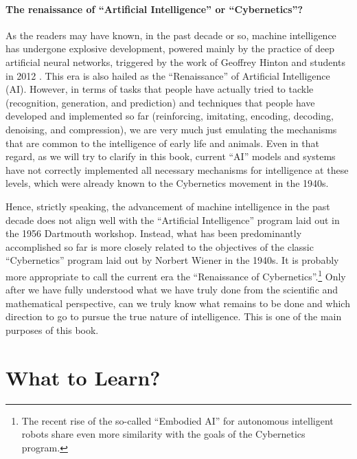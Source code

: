 \documentclass[../../book-main.tex]{subfiles}
\begin{document}
\paragraph{The renaissance of ``Artificial Intelligence'' or ``Cybernetics''?}
As the readers may have known, in the past decade or so, machine intelligence has undergone explosive development, powered mainly by the practice of deep artificial neural networks, triggered by the work of Geoffrey Hinton and students in 2012 \cite{krizhevsky2012imagenet}. This era is also hailed as the ``Renaissance'' of Artificial Intelligence (AI). However, in terms of tasks that people have actually tried to tackle (recognition, generation, and prediction) and techniques that people have developed and implemented so far (reinforcing, imitating, encoding, decoding, denoising, and compression), we are very much just emulating the mechanisms that are common to the intelligence of early life and animals. Even in that regard, as we will try to clarify in this book, current ``AI'' models and systems have not correctly implemented all necessary mechanisms for intelligence at these levels, which were already known to the Cybernetics movement in the 1940s. 

Hence, strictly speaking, the advancement of machine intelligence in the past decade does not align well with the ``Artificial Intelligence'' program laid out in the 1956 Dartmouth workshop. Instead, what has been predominantly accomplished so far is more closely related to the objectives of the classic ``Cybernetics'' program laid out by Norbert Wiener in the 1940s. It is probably more appropriate to call the current era the ``Renaissance of Cybernetics''.\footnote{The recent rise of the so-called ``Embodied AI'' for autonomous intelligent robots share even more similarity with the goals of the Cybernetics program.} Only after we have fully understood what we have truly done from the scientific and mathematical perspective, can we truly know what remains to be done and which direction to go to pursue the true nature of intelligence. This is one of the main purposes of this book. 


\section{What to Learn?}
\label{sec:what-to-learn}
\end{document}
